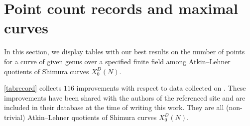 \documentclass[11pt,reqno]{amsart}
\theoremstyle{definition}
\begin{document}

\section{Point count records and maximal curves}\label{section: maximal_curves}

In this section, we display tables with our best results on the number of points for a curve of given genus over a specified finite field among Atkin--Lehner quotients of Shimura curves $X_0^D(N)$.%

\cref{tabrecord} collects $116$ improvements with respect to data collected on \cite{ManyPoints}. These improvements have been shared with the authors of the referenced site and are included in their database at the time of writing this work. They are all (non-trivial) Atkin--Lehner quotients of Shimura curves $X_0^D(N)$.%
\end{document}
